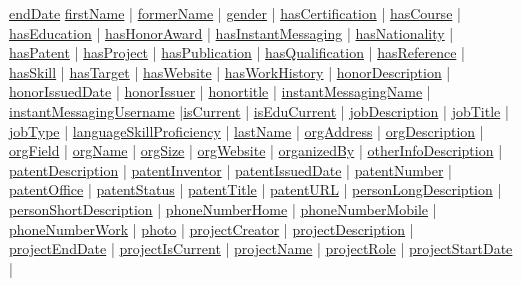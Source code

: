 \documentclass[a4paper,12pt]{article}
\numberwithin{equation}{section}
\begin{document}
\hyperlink{endDate}{endDate} 
\hyperlink{firstName}{firstName} |
\hyperlink{formerName}{formerName} |
\hyperlink{gender}{gender} |
\hyperlink{hasCertification}{hasCertification} |
\hyperlink{hasCourse}{hasCourse} |
\hyperlink{hasEducation}{hasEducation} |
\hyperlink{hasHonorAward}{hasHonorAward} |
\hyperlink{hasInstantMessaging}{hasInstantMessaging} | \hyperlink{hasNationality}{hasNationality} | \hyperlink{hasPatent}{hasPatent} |
\hyperlink{hasProject}{hasProject} |
\hyperlink{hasPublication}{hasPublication} |
\hyperlink{hasQualification}{hasQualification} | \hyperlink{hasReference}{hasReference} | \hyperlink{hasSkill}{hasSkill} | \hyperlink{hasTarget}{hasTarget} |  \hyperlink{hasWebsite}{hasWebsite} | \hyperlink{hasWorkHistory}{hasWorkHistory} |
\hyperlink{honorDescription}{honorDescription} |
\hyperlink{honorIssuedDate}{honorIssuedDate} |
\hyperlink{honorIssuer}{honorIssuer} |
\hyperlink{honortitle}{honortitle} |
\hyperlink{instantMessagingName}{instantMessagingName} | \hyperlink{instantMessagingUsername}{instantMessagingUsername} |\hyperlink{isCurrent}{isCurrent} |
\hyperlink{isEduCurrent}{isEduCurrent} |
\hyperlink{jobDescription}{jobDescription} |  \hyperlink{jobTitle}{jobTitle} |
\hyperlink{jobType}{jobType} |
\hyperlink{languageSkillProficiency}{languageSkillProficiency} |
\hyperlink{lastName}{lastName} |
\hyperlink{orgAddress}{orgAddress} | \hyperlink{orgDescription}{orgDescription} | \hyperlink{orgField}{orgField} |
\hyperlink{orgName}{orgName} |
\hyperlink{orgSize}{orgSize} |
\hyperlink{orgWebsite}{orgWebsite} |
\hyperlink{organizedBy}{organizedBy} | \hyperlink{otherInfoDescription}{otherInfoDescription} | \hyperlink{patentDescription}{patentDescription} | 
\hyperlink{patentInventor}{patentInventor} | 
\hyperlink{patentIssuedDate}{patentIssuedDate} | 
\hyperlink{patentNumber}{patentNumber} | 
\hyperlink{patentOffice}{patentOffice} | 
\hyperlink{patentStatus}{patentStatus} | 
\hyperlink{patentTitle}{patentTitle} | 
\hyperlink{patentURL}{patentURL} | 
\hyperlink{personLongDescription}{personLongDescription} | 
\hyperlink{personShortDescription}{personShortDescription} | 
\hyperlink{phoneNumberHome}{phoneNumberHome} | 
\hyperlink{phoneNumberMobile}{phoneNumberMobile} | 
\hyperlink{phoneNumberWork}{phoneNumberWork} | 
\hyperlink{photo}{photo} |
\hyperlink{projectCreator}{projectCreator} | 
\hyperlink{projectDescription}{projectDescription} | 
\hyperlink{projectEndDate}{projectEndDate} | 
\hyperlink{projectIsCurrent}{projectIsCurrent} | 
\hyperlink{projectName}{projectName} | 
\hyperlink{projectRole}{projectRole} | 
\hyperlink{projectStartDate}{projectStartDate} | 
\end{document}
